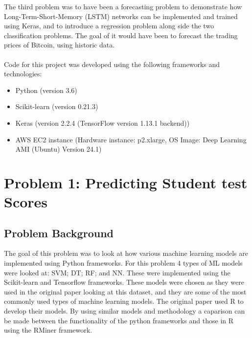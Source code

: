\documentclass[12pt,a4paper,titlepage,twoside]{report}
\begin{document}
	The third problem was to have been a forecasting problem to demonstrate how Long-Term-Short-Memory (LSTM) networks can be implemented and trained using Keras, and to introduce a regression problem along side the two classification problems. The goal of it would have been to forecast the trading prices of Bitcoin, using historic data. \\ \\	
	Code for this project was developed using the following frameworks and technologies:
	\begin{itemize}
	\item Python (version 3.6)
	\item Scikit-learn (version 0.21.3)
	\item Keras (version 2.2.4 (TensorFlow version 1.13.1 backend))
	\item AWS EC2 instance (Hardware instance: p2.xlarge, OS Image: Deep Learning AMI (Ubuntu) Version 24.1)
	\end{itemize}
	
	
\chapter{Problem 1: Predicting Student test Scores}

\section{Problem Background}
	 The goal of this problem was to look at how various machine learning models are implemented using Python frameworks. For this problem 4 types of ML models were looked at: SVM; DT; RF; and NN. These were implemented using the Scikit-learn and Tensorflow frameworks. These models were chosen as they were used in the original paper looking at this dataset\cite{student-dataset}, and they are some of the most commonly used types of machine learning models. The original paper used R to develop their models. By using similar models and methodology a caparison can be made between the functionality of the python frameworks and those in R using the RMiner framework. 
	
\end{document}
